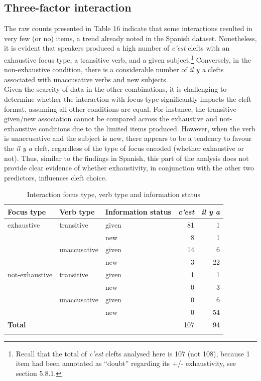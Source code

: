 \subsection{Three-factor interaction}
The raw counts presented in Table 16 indicate that some interactions resulted in very few (or no) items, a trend already noted in the Spanish dataset. Nonetheless, it is evident that speakers produced a high number of \textit{c'est} clefts with an exhaustive focus type, a transitive verb, and a given subject.\footnote{Recall that the total of \textit{c'est} clefts analysed here is 107 (not 108), because 1 item had been annotated as ``doubt” regarding its +/- exhaustivity, see section 5.8.1.} Conversely, in the non-exhaustive condition, there is a considerable number of \textit{il y a} clefts associated with unaccusative verbs and new subjects.\\
Given the scarcity of data in the other combinations, it is challenging to determine whether the interaction with focus type significantly impacts the cleft format, assuming all other conditions are equal. For instance, the transitive-given/new association cannot be compared across the exhaustive and not-exhaustive conditions due to the limited items produced.
However, when the verb is unaccusative and the subject is new, there appears to be a tendency to favour the \textit{il y a} cleft, regardless of the type of focus encoded (whether exhaustive or not). Thus, similar to the findings in Spanish, this part of the analysis does not provide clear evidence of whether exhaustivity, in conjunction with the other two predictors, influences cleft choice.



\begin{table}
\begin{tabular}{lllrr}
\lsptoprule
Focus type & Verb type & Information status & \textit{c'est} & \textit{il y a}\\
\midrule
exhaustive & transitive & given & 81 & 1\\
 &  & new & 8 & 1\\
 & unaccusative & given & 14 & 6\\
 &  & new & 3 & 22\\
not-exhaustive & transitive & given & 1 & 1\\
 &  & new & 0 & 3\\
 & unaccusative & given & 0 & 6\\
 &  & new & 0 & 54\\
\midrule
 \textbf{Total} & & & 107 & 94\\
 \lspbottomrule
\end{tabular}
\caption{
Interaction focus type, verb type and information status}
\end{table}

